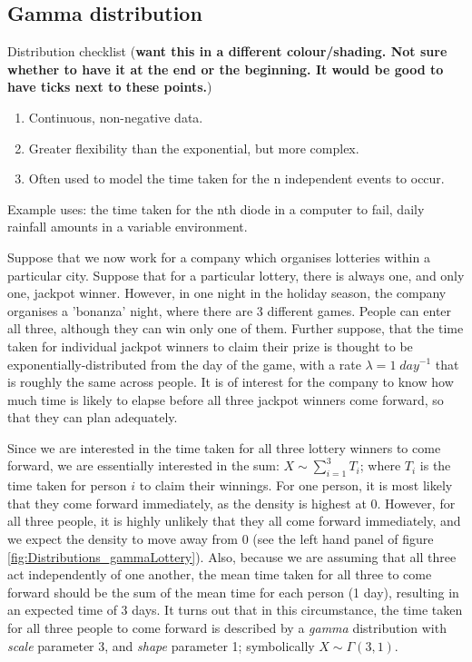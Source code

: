 \documentclass[11pt,fullpage]{book}
\begin{document}
\subsection{Gamma distribution}
Distribution checklist (\textbf{want this in a different colour/shading. Not sure whether to have it at the end or the beginning. It would be good to have ticks next to these points.})

\begin{enumerate} 
\item Continuous, non-negative data.
\item Greater flexibility than the exponential, but more complex.
\item Often used to model the time taken for the n independent events to occur.
\end{enumerate}

Example uses: the time taken for the nth diode in a computer to fail, daily rainfall amounts in a variable environment.

Suppose that we now work for a company which organises lotteries within a particular city. Suppose that for a particular lottery, there is always one, and only one, jackpot winner. However, in one night in the holiday season, the company organises a 'bonanza' night, where there are 3 different games. People can enter all three, although they can win only one of them. Further suppose, that the time taken for individual jackpot winners to claim their prize is thought to be exponentially-distributed from the day of the game, with a rate $\lambda=1\; day^{-1}$  that is roughly the same across people. It is of interest for the company to know how much time is likely to elapse before all three jackpot winners come forward, so that they can plan adequately. 

Since we are interested in the time taken for all three lottery winners to come forward, we are essentially interested in the sum: $X\sim \sum\limits_{i=1}^{3} T_i$; where $T_i$ is the time taken for person $i$ to claim their winnings. For one person, it is most likely that they come forward immediately, as the density is highest at 0. However, for all three people, it is highly unlikely that they all come forward immediately, and we expect the density to move away from 0 (see the left hand panel of figure \ref{fig:Distributions_gammaLottery}). Also, because we are assuming that all three act independently of one another, the mean time taken for all three to come forward should be the sum of the mean time for each person (1 day), resulting in an expected time of 3 days. It turns out that in this circumstance, the time taken for all three people to come forward is described by a \textit{gamma} distribution with \textit{scale} parameter 3, and \textit{shape} parameter 1; symbolically $X\sim \Gamma(3,1)$. 
\end{document}
